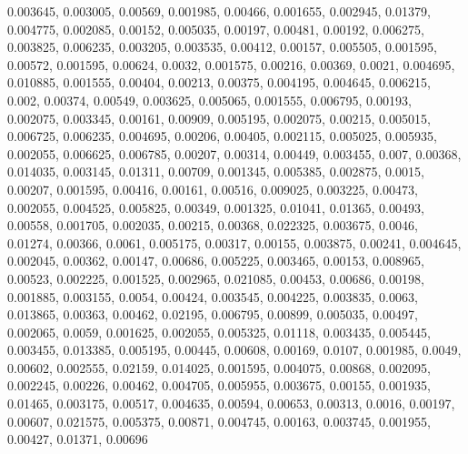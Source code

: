 0.003645, 0.003005, 0.00569, 0.001985, 0.00466, 0.001655, 0.002945, 0.01379, 0.004775, 0.002085, 0.00152, 0.005035, 0.00197, 0.00481, 0.00192, 0.006275, 0.003825, 0.006235, 0.003205, 0.003535, 0.00412, 0.00157, 0.005505, 0.001595, 0.00572, 0.001595, 0.00624, 0.0032, 0.001575, 0.00216, 0.00369, 0.0021, 0.004695, 0.010885, 0.001555, 0.00404, 0.00213, 0.00375, 0.004195, 0.004645, 0.006215, 0.002, 0.00374, 0.00549, 0.003625, 0.005065, 0.001555, 0.006795, 0.00193, 0.002075, 0.003345, 0.00161, 0.00909, 0.005195, 0.002075, 0.00215, 0.005015, 0.006725, 0.006235, 0.004695, 0.00206, 0.00405, 0.002115, 0.005025, 0.005935, 0.002055, 0.006625, 0.006785, 0.00207, 0.00314, 0.00449, 0.003455, 0.007, 0.00368, 0.014035, 0.003145, 0.01311, 0.00709, 0.001345, 0.005385, 0.002875, 0.0015, 0.00207, 0.001595, 0.00416, 0.00161, 0.00516, 0.009025, 0.003225, 0.00473, 0.002055, 0.004525, 0.005825, 0.00349, 0.001325, 0.01041, 0.01365, 0.00493, 0.00558, 0.001705, 0.002035, 0.00215, 0.00368, 0.022325, 0.003675, 0.0046, 0.01274, 0.00366, 0.0061, 0.005175, 0.00317, 0.00155, 0.003875, 0.00241, 0.004645, 0.002045, 0.00362, 0.00147, 0.00686, 0.005225, 0.003465, 0.00153, 0.008965, 0.00523, 0.002225, 0.001525, 0.002965, 0.021085, 0.00453, 0.00686, 0.00198, 0.001885, 0.003155, 0.0054, 0.00424, 0.003545, 0.004225, 0.003835, 0.0063, 0.013865, 0.00363, 0.00462, 0.02195, 0.006795, 0.00899, 0.005035, 0.00497, 0.002065, 0.0059, 0.001625, 0.002055, 0.005325, 0.01118, 0.003435, 0.005445, 0.003455, 0.013385, 0.005195, 0.00445, 0.00608, 0.00169, 0.0107, 0.001985, 0.0049, 0.00602, 0.002555, 0.02159, 0.014025, 0.001595, 0.004075, 0.00868, 0.002095, 0.002245, 0.00226, 0.00462, 0.004705, 0.005955, 0.003675, 0.00155, 0.001935, 0.01465, 0.003175, 0.00517, 0.004635, 0.00594, 0.00653, 0.00313, 0.0016, 0.00197, 0.00607, 0.021575, 0.005375, 0.00871, 0.004745, 0.00163, 0.003745, 0.001955, 0.00427, 0.01371, 0.00696